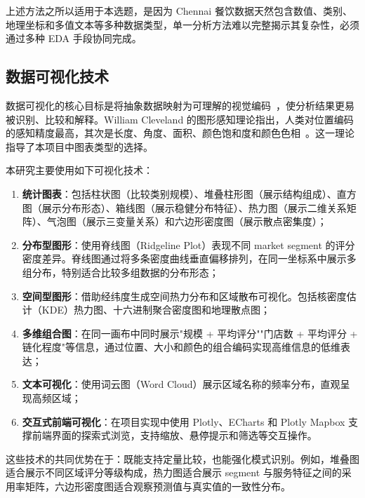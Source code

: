 \documentclass[11pt,a4paper]{article}
\begin{document}
上述方法之所以适用于本选题，是因为 Chennai 餐饮数据天然包含数值、类别、地理坐标和多值文本等多种数据类型，单一分析方法难以完整揭示其复杂性，必须通过多种 EDA 手段协同完成。

\subsection{数据可视化技术}

数据可视化的核心目标是将抽象数据映射为可理解的视觉编码~\cite{heer}，使分析结果更易被识别、比较和解释。William Cleveland 的图形感知理论指出，人类对位置编码的感知精度最高，其次是长度、角度、面积、颜色饱和度和颜色色相~\cite{cleveland}。这一理论指导了本项目中图表类型的选择。

本研究主要使用如下可视化技术：

\begin{enumerate}[leftmargin=2em]
    \item \textbf{统计图表}：包括柱状图（比较类别规模）、堆叠柱形图（展示结构组成）、直方图（展示分布形态）、箱线图（展示稳健分布特征）、热力图（展示二维关系矩阵）、气泡图（展示三变量关系）和六边形密度图（展示散点密集度）；

    \item \textbf{分布型图形}：使用脊线图（Ridgeline Plot）表现不同 market segment 的评分密度差异。脊线图通过将多条密度曲线垂直偏移排列，在同一坐标系中展示多组分布，特别适合比较多组数据的分布形态；

    \item \textbf{空间型图形}：借助经纬度生成空间热力分布和区域散布可视化。包括核密度估计（KDE）热力图、十六进制聚合密度图和地理散点图；

    \item \textbf{多维组合图}：在同一画布中同时展示"规模 + 平均评分""门店数 + 平均评分 + 链化程度"等信息，通过位置、大小和颜色的组合编码实现高维信息的低维表达；

    \item \textbf{文本可视化}：使用词云图（Word Cloud）展示区域名称的频率分布，直观呈现高频区域；

    \item \textbf{交互式前端可视化}：在项目实现中使用 Plotly、ECharts 和 Plotly Mapbox 支撑前端界面的探索式浏览，支持缩放、悬停提示和筛选等交互操作。
\end{enumerate}

这些技术的共同优势在于：既能支持定量比较，也能强化模式识别。例如，堆叠图适合展示不同区域评分等级构成，热力图适合展示 segment 与服务特征之间的采用率矩阵，六边形密度图适合观察预测值与真实值的一致性分布。
\end{document}
